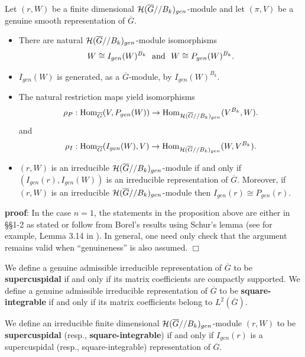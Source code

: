 \begin{proposition}
\label{prop:borel}
Let $(r,W)$ be a finite dimensional
${\cal H}(\overline{G}//B_k)_{gen}$-module and let
$(\pi,V)$ be a genuine smooth representation of $\overline{G}$.
\begin{itemize}
\item[(a)] 
There are natural ${\cal H}(\overline{G}//B_k)_{gen}$-module
isomorphisms
\[
W\cong I_{gen}(W)^{B_k}\ \ 
{\rm and}\ \ W\cong P_{gen}(W)^{B_k}. 
\]
\item[(b)] 
$I_{gen}(W)$ is generated, as a $\overline{G}$-module,
by $I_{gen}(W)^{B_k}$.
\item[(c)]
The natural restriction maps yield isomorphisms
\[
\rho_P : {\rm Hom}_{\overline{G}}(V,P_{gen}(W))
\rightarrow 
 {\rm Hom}_{{\cal H}(\overline{G}//B_k)_{gen}}(V^{B_k},W).
\]
and
\[
\rho_I : {\rm Hom}_{\overline{G}}(I_{gen}(W),V)
\rightarrow 
 {\rm Hom}_{{\cal H}(\overline{G}//B_k)_{gen}}(W,V^{B_k}).
\]
\item[(d)]
$(r,W)$ is an irreducible
${\cal H}(\overline{G}//B_k)_{gen}$-module if
and only if $(I_{gen}(r),I_{gen}(W))$ is an irreducible
representation of $\overline{G}$. Moreover, if
$(r,W)$ is an irreducible
${\cal H}(\overline{G}//B_k)_{gen}$-module then
$I_{gen}(r)\cong P_{gen}(r)$.
\end{itemize}
\end{proposition}

{\bf proof}: In the case $n=1$,
the statements in the proposition above are either in \S\S 1-2 \cite{Bo} 
as stated or follow from Borel's results using Schur's lemma
(see for example, Lemma 3.14 in \cite{CR}).
In general, one need only check that the
argument remains valid when ``genuineness'' is also assumed.
$\Box$

\begin{definition} 
We define a genuine
admissible irreducible representation
of $\overline{G}$ to be {\bf supercuspidal} 
if and only if its matrix coefficients are compactly supported.
We define a genuine
admissible irreducible representation
of $\overline{G}$ to be {\bf square-integrable} 
if and only if
its matrix coefficients belong to $L^2(\overline{G})$.

We define an irreducible finite dimensional
${\cal H}(\overline{G}//B_k)_{gen}$-module $(r,W)$ to be 
{\bf supercuspidal} (resp., {\bf square-integrable})
if and only if $I_{gen}(r)$ is a supercuspidal 
(resp., square-integrable) representation of
$\overline{G}$. 
\end{definition} 

